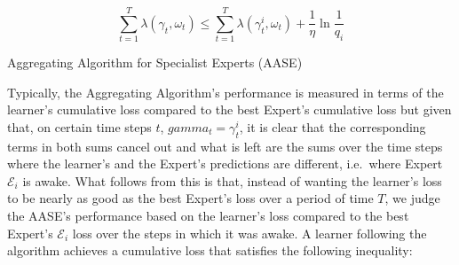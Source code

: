 \begin{equation}
    \overset{T}{\underset{t=1}{\sum}}\lambda(\gamma_t, \omega_t) \leq \overset{T}{\underset{t=1}{\sum}}\lambda(\gamma_t^i, \omega_t) + \frac{1}{\eta} \ln \frac{1}{q_i}
\end{equation}

\begin{algorithm}[ht]
    \caption{Aggregating Algorithm for Specialist Experts (AASE)}\label{algorithm:aggregating_algorithm_for_specialist_experts}
    \begin{algorithmic}[1]
    \end{algorithmic}
\end{algorithm}

Typically, the Aggregating Algorithm's performance is measured in terms of the learner's cumulative loss compared to the best Expert's cumulative loss but given that, on certain time steps $t$, $gamma_t = \gamma_t^i$, it is clear that the corresponding terms in both sums cancel out and what is left are the sums over the time steps where the learner's and the Expert's predictions are different, i.e.\ where Expert $\mathcal{E}_i$ is awake. What follows from this is that, instead of wanting the learner's loss to be nearly as good as the best Expert's loss over a period of time $T$, we judge the AASE's performance based on the learner's loss compared to the best Expert's $\mathcal{E}_i$ loss over the steps in which it was awake. A learner following the algorithm achieves a cumulative loss that satisfies the following inequality:

